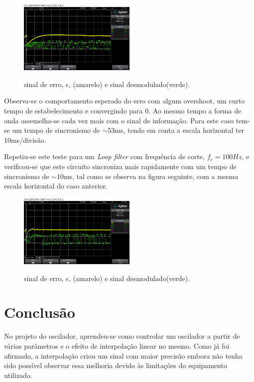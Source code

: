 \documentclass[11pt]{article}
\numberwithin{equation}{section}
\begin{document}
\begin{figure}[H]
	\centering
	\includegraphics[width=0.5\textwidth]{./transient10Hz}~\\
	\caption{sinal de erro, $\epsilon$, (amarelo) e sinal desmodulado(verde).}
	\label{trans10}
\end{figure}
Observa-se o comportamento esperado do erro com algum overshoot, um curto tempo de estabelecimento e convergindo para 0. Ao mesmo tempo a forma de onda assemelha-se cada vez mais com o sinal de informação. Para este caso tem-se um tempo de sincronismo de $\sim$53ms, tendo em conta a escala horizontal ter 10ms/divisão.

Repetiu-se este teste para um \textit{Loop filter} com frequência de corte, $f_c = 100Hz$, e verificou-se que este circuito sincroniza mais rapidamente com um tempo de sincronismo de $\sim$10ms, tal como se observa na figura seguinte, com a mesma escala horizontal do caso anterior.

\begin{figure}[H]
	\centering
	\includegraphics[width=0.5\textwidth]{./transient100Hz}~\\
	\caption{sinal de erro, $\epsilon$, (amarelo) e sinal desmodulado(verde).}
	\label{trans100}
\end{figure}


\section{Conclusão}


No projeto do oscilador, aprendeu-se como controlar um oscilador a partir de vários parâmetros e o efeito de interpolação linear no mesmo. Como já foi afirmado, a interpolação criou um sinal com maior precisão embora não tenha sido possível observar essa melhoria devido às limitações do equipamento utilizado.
\end{document}
